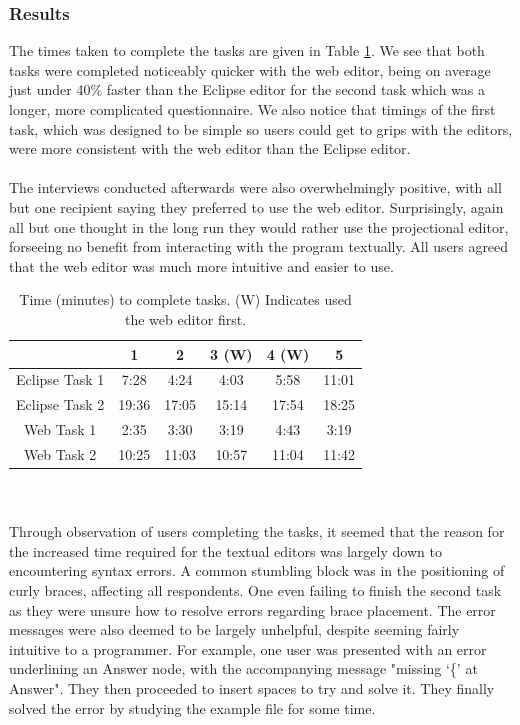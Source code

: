 \documentclass{article}
\begin{document}
{\subsubsection{Results}
The times taken to complete the tasks are given in Table \ref{Tab:questionnaireResults}. We see that both tasks were completed noticeably quicker with the web editor, being on average just under 40\% faster than the Eclipse editor for the second task which was a longer, more complicated questionnaire. We also notice that timings of the first task, which was designed to be simple so users could get to grips with the editors, were more consistent with the web editor than the Eclipse editor.
\\
\\
The interviews conducted afterwards were also overwhelmingly positive, with all but one recipient saying they preferred to use the web editor. Surprisingly, again all but one thought in the long run they would rather use the projectional editor, forseeing no benefit from interacting with the program textually. All users agreed that the web editor was much more intuitive and easier to use.
\begin{table}[ht]
\centering
	\begin{tabular}{| c | c | c | c | c | c |}
	\hline
	& 1  & 2 & 3 (W) & 4 (W) & 5 \\
	\hline 
	Eclipse Task 1 & 7:28 & 4:24 & 4:03 & 5:58 & 11:01 \\
	Eclipse Task 2 & 19:36 & 17:05 & 15:14 & 17:54 & 18:25 \\
	Web Task 1 & 2:35 & 3:30 & 3:19 & 4:43 & 3:19 \\
	Web Task 2 & 10:25 & 11:03 & 10:57 & 11:04 & 11:42 \\
	\hline
	\end{tabular}
	\caption{Time (minutes) to complete tasks. (W) Indicates used the web editor first.}
	\label{Tab:questionnaireResults}
\end{table}
\\
\\
Through observation of users completing the tasks, it seemed that the reason for the increased time required for the textual editors was largely down to encountering syntax errors. A common stumbling block was in the positioning of curly braces, affecting all respondents. One even failing to finish the second task as they were unsure how to resolve errors regarding brace placement. The error messages were also deemed to be largely unhelpful, despite seeming fairly intuitive to a programmer. For example, one user was presented with an error underlining an Answer node, with the accompanying message "missing `\{' at Answer". They then proceeded to insert spaces to try and solve it. They finally solved the error by studying the example file for some time. 
}
\end{document}
